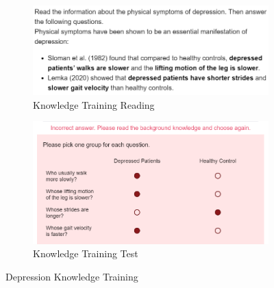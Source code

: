 \documentclass[mnsc]{informs3b} %
\begin{document}
\begin{figure}[h]
\centering
\begin{subfigure}{0.51\textwidth}
    \includegraphics[width=\textwidth]{imgs/user-study-training.PNG}
    \caption{Knowledge Training Reading}
    \label{fig:dep_kldg_reading}
\end{subfigure}
\hfill
\begin{subfigure}{0.37\textwidth}
    \includegraphics[width=\textwidth]{imgs/training-question.PNG}
    \caption{Knowledge Training Test}
    \label{fig:kldg_test}
\end{subfigure}
\caption{Depression Knowledge Training}
\label{fig:dep_kldg_training}
\end{figure}
\end{document}
